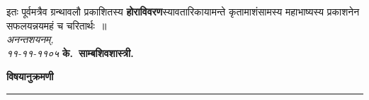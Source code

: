 \documentclass[11pt, openany]{book}
\begin{document}
इतः पूर्वमत्रैव ग्रन्थावलौ प्रकाशितस्य \textbf{होराविवरण}स्यावतारिकायामन्ते कृतामाशंसामस्य महाभाष्यस्य प्रकाशनेन सफलयन्नयमहं च चरितार्थः~॥\\

\noindent \emph{अनन्तशयनम्,}\\
\noindent \emph{११-११-११०५  }\hspace{5.9cm}  \textbf{के.~साम्बशिवशास्त्री.}


\newpage

\thispagestyle{empty}
\begin{center}
	\textbf{विषयानुक्रमणी} \\
	\rule{0.08\linewidth}{0.3pt}\end{center} 
\renewcommand{\arraystretch}{1.25}
\vspace{1cm}
\end{document}
